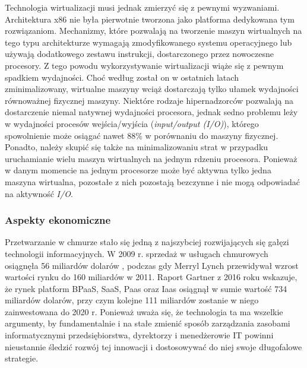 \documentclass[12pt,a4paper,twoside]{article}
\begin{document}
Technologia wirtualizacji musi jednak zmierzyć się z pewnymi wyzwaniami. Architektura x86 nie była pierwotnie tworzona jako platforma dedykowana tym rozwiązaniom. Mechanizmy, które pozwalają na tworzenie maszyn wirtualnych na tego typu architekturze wymagają zmodyfikowanego systemu operacyjnego lub używają dodatkowego zestawu instrukcji, dostarczonego przez nowoczesne procesory. Z tego powodu wykorzystywanie wirtualizacji wiąże się z pewnym spadkiem wydajności. Choć według \citet{menon2005} został on w ostatnich latach zminimalizowany, wirtualne maszyny wciąż dostarczają tylko ułamek wydajności równoważnej fizycznej maszyny. Niektóre rodzaje hipernadzorców pozwalają na dostarczenie niemal natywnej wydajności procesora, jednak sedno problemu leży w wydajności procesów wejścia/wyjścia (\textit{input/output (I/O)}), którego spowolnienie może osiągać nawet 88\% w porównaniu do maszyny fizycznej. Ponadto, należy skupić się także na minimalizowaniu strat w przypadku uruchamianie wielu maszyn wirtualnych na jednym rdzeniu procesora. Ponieważ w danym momencie na jednym procesorze może być aktywna tylko jedna maszyna wirtualna, pozostałe z nich pozostają bezczynne i nie mogą odpowiadać na aktywność \textit{I/O}.

\subsubsection{Aspekty ekonomiczne}

\noindent
Przetwarzanie w chmurze stało się jedną z najszybciej rozwijających się gałęzi technologii informacyjnych. W 2009 r. sprzedaż w usługach chmurowych osiągnęła 56 miliardów dolarów \citep{smith2009}, podczas gdy Merryl Lynch przewidywał wzrost wartości rynku do 160 miliardów w 2011. Raport Gartner z 2016 roku \citep{anderson2016} wskazuje, że rynek platform BPaaS, SaaS, Paas oraz Iaas osiągnął w sumie wartość 734 miliardów dolarów, przy czym kolejne 111 miliardów zostanie w niego zainwestowana do 2020 r. Ponieważ uważa się, że technologia ta ma wszelkie argumenty, by fundamentalnie i na stałe zmienić sposób zarządzania zasobami informatycznymi przedsiębiorstwa, dyrektorzy i menedżerowie IT powinni nieustannie śledzić rozwój tej innowacji i dostosowywać do niej swoje długofalowe strategie.
\end{document}
